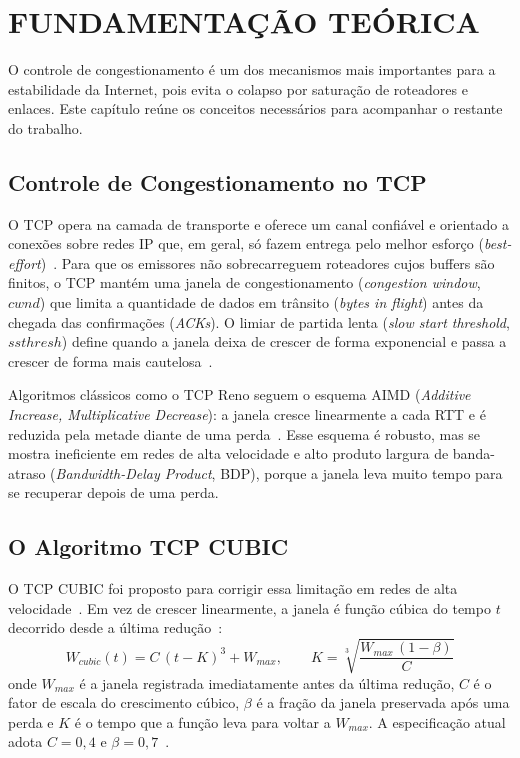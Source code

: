 \chapter{FUNDAMENTAÇÃO TEÓRICA}
O controle de congestionamento é um dos mecanismos mais importantes para a estabilidade da Internet, pois evita o colapso por saturação de roteadores e enlaces. Este capítulo reúne os conceitos necessários para acompanhar o restante do trabalho.

\section{Controle de Congestionamento no TCP}
O TCP opera na camada de transporte e oferece um canal confiável e orientado a conexões sobre redes IP que, em geral, só fazem entrega pelo melhor esforço (\textit{best-effort})~\cite{rfc9293,kurose2017}. Para que os emissores não sobrecarreguem roteadores cujos buffers são finitos, o TCP mantém uma janela de congestionamento (\textit{congestion window}, $cwnd$) que limita a quantidade de dados em trânsito (\textit{bytes in flight}) antes da chegada das confirmações (\textit{ACKs}). O limiar de partida lenta (\textit{slow start threshold}, $ssthresh$) define quando a janela deixa de crescer de forma exponencial e passa a crescer de forma mais cautelosa~\cite{rfc5681}.

Algoritmos clássicos como o TCP Reno seguem o esquema AIMD (\textit{Additive Increase, Multiplicative Decrease}): a janela cresce linearmente a cada RTT e é reduzida pela metade diante de uma perda~\cite{rfc5681,kurose2017}. Esse esquema é robusto, mas se mostra ineficiente em redes de alta velocidade e alto produto largura de banda-atraso (\textit{Bandwidth-Delay Product}, BDP), porque a janela leva muito tempo para se recuperar depois de uma perda.

\section{O Algoritmo TCP CUBIC}
O TCP CUBIC foi proposto para corrigir essa limitação em redes de alta velocidade~\cite{ha2008}. Em vez de crescer linearmente, a janela é função cúbica do tempo $t$ decorrido desde a última redução~\cite{rfc9438}:
\begin{equation}
    W_{cubic}(t) = C\,(t-K)^3 + W_{max}, \qquad K = \sqrt[3]{\frac{W_{max}\,(1-\beta)}{C}}
\end{equation}
onde $W_{max}$ é a janela registrada imediatamente antes da última redução, $C$ é o fator de escala do crescimento cúbico, $\beta$ é a fração da janela preservada após uma perda e $K$ é o tempo que a função leva para voltar a $W_{max}$. A especificação atual adota $C=0{,}4$ e $\beta=0{,}7$~\cite{rfc9438}.

